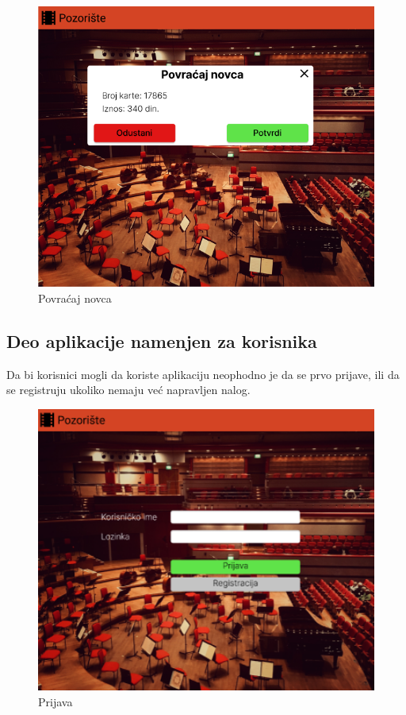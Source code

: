 \documentclass[a4paper]{article}
\begin{document}
\begin{figure}[H]
  \begin{center}
    \includegraphics[width=130mm]{../images/blagajnik_povracaj_novca2.png}
  \end{center}
  \caption{Povraćaj novca}
  \label{blagajnik_povracaj_novca2}
\end{figure}


\subsection{Deo aplikacije namenjen za korisnika}

Da bi korisnici mogli da koriste aplikaciju neophodno je da se prvo prijave, ili da se registruju ukoliko nemaju već napravljen nalog.

\begin{figure}[H]
  \begin{center}
    \includegraphics[width=130mm]{../images/ui_klijent_prijava.png}
  \end{center}
  \caption{Prijava}
  \label{prijava_klijenta}
\end{figure}
\end{document}
